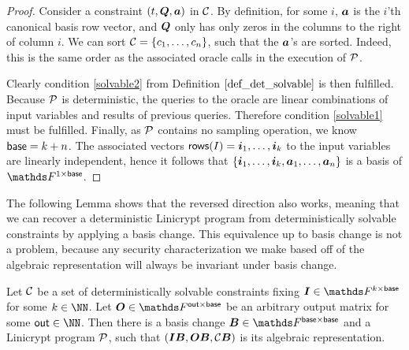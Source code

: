 \begin{proof}
    Consider a constraint $(t, \Q, \va)$ in $\C$.
    By definition, for some $i$,
    $\va$ is the $i$'th canonical basis row vector,
    and $\Q$ only has only zeros in the columns to the right of column $i$.
    We can sort $\C = \{\dts c n\}$, such that the $\va$'s are sorted.
    Indeed, this is the same order as the associated oracle calls in the execution of $\P$.
    
    Clearly condition \ref{solvable2} from Definition $\ref{def_det_solvable}$ is then fulfilled.
    Because $\P$ is deterministic, 
    the queries to the oracle are linear combinations of input variables and results of previous queries.
    Therefore condition \ref{solvable1} must be fulfilled.
    Finally, as $\P$ contains no sampling operation, we know $\base = k + n$.
    The associated vectors $\rows(I) = \dts \vi k$ to the input variables are linearly independent,
    hence it follows that $\{ \dts \vi k, \dts \va n \}$ is a basis of $\F^{1\times\base}$. 
\end{proof}

The following Lemma shows that the reversed direction also works,
meaning that we can recover a deterministic Linicrypt program from deterministically solvable constraints by applying a basis change.
This equivalence up to basis change is not a problem, 
because any security characterization we make based off of the algebraic representation will always be invariant under basis change.

\begin{lemma}
\label{det_solvable_lemma}
    Let $\C$ be a set of deterministically solvable constraints fixing $\Inp \in \F^{k \times \base}$ for some $k \in \NN$.
    Let $\O \in \F^{\out \times \base}$ be an arbitrary output matrix for some $\out \in \NN$.
    Then there is a basis change $\B \in \F^{\base \times \base}$
    and a Linicrypt program $\P$,
    such that $(\Inp \B, \O \B, \C \B)$ is its algebraic representation.
\end{lemma}

